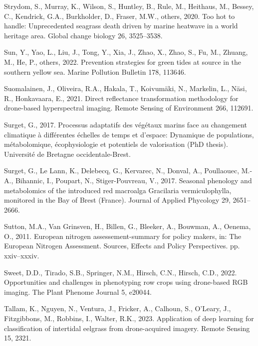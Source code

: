 \documentclass[
  letterpaper,
  11pt,
  english,
  singlespacing,
  headsepline]{MastersDoctoralThesis}
\newlength{\cslhangindent}
\newenvironment{CSLReferences}[2] %
 {\begin{list}{}{%
  \setlength{\itemindent}{0pt}
  \setlength{\leftmargin}{0pt}
  \setlength{\parsep}{0pt}
  \ifodd #1
   \setlength{\leftmargin}{\cslhangindent}
   \setlength{\itemindent}{-1\cslhangindent}
  \fi
  \setlength{\itemsep}{#2\baselineskip}}}
 {\end{list}}
\begin{document}
\begin{CSLReferences}{1}{0}
Strydom, S., Murray, K., Wilson, S., Huntley, B., Rule, M., Heithaus,
M., Bessey, C., Kendrick, G.A., Burkholder, D., Fraser, M.W., others,
2020. Too hot to handle: Unprecedented seagrass death driven by marine
heatwave in a world heritage area. Global change biology 26, 3525--3538.

Sun, Y., Yao, L., Liu, J., Tong, Y., Xia, J., Zhao, X., Zhao, S., Fu,
M., Zhuang, M., He, P., others, 2022. Prevention strategies for green
tides at source in the southern yellow sea. Marine Pollution Bulletin
178, 113646.

Suomalainen, J., Oliveira, R.A., Hakala, T., Koivumäki, N., Markelin,
L., Näsi, R., Honkavaara, E., 2021. Direct reflectance transformation
methodology for drone-based hyperspectral imaging. Remote Sensing of
Environment 266, 112691.

Surget, G., 2017. Processus adaptatifs des v{é}g{é}taux marins face au
changement climatique {à} diff{é}rentes {é}chelles de temps et d'espace:
Dynamique de populations, m{é}tabolomique, {é}cophysiologie et
potentiels de valorisation (PhD thesis). Universit{é} de Bretagne
occidentale-Brest.

Surget, G., Le Lann, K., Delebecq, G., Kervarec, N., Donval, A.,
Poullaouec, M.-A., Bihannic, I., Poupart, N., Stiger-Pouvreau, V., 2017.
Seasonal phenology and metabolomics of the introduced red macroalga
{G}racilaria vermiculophylla, monitored in the {B}ay of {B}rest
({F}rance). Journal of Applied Phycology 29, 2651--2666.

Sutton, M.A., Van Grinsven, H., Billen, G., Bleeker, A., Bouwman, A.,
Oenema, O., 2011. European nitrogen assessement-summary for policy
makers, in: The European Nitrogen Assessment. Sources, Effects and
Policy Perspectives. pp. xxiv--xxxiv.

Sweet, D.D., Tirado, S.B., Springer, N.M., Hirsch, C.N., Hirsch, C.D.,
2022. Opportunities and challenges in phenotyping row crops using
drone-based RGB imaging. The Plant Phenome Journal 5, e20044.

Tallam, K., Nguyen, N., Ventura, J., Fricker, A., Calhoun, S., O'Leary,
J., Fitzgibbons, M., Robbins, I., Walter, R.K., 2023. Application of
deep learning for classification of intertidal eelgrass from
drone-acquired imagery. Remote Sensing 15, 2321.


\end{CSLReferences}
\end{document}
